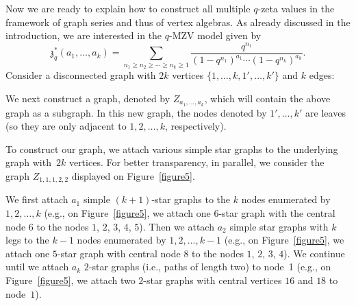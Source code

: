 \documentclass[pdftex]{sigma}
\numberwithin{equation}{section}
\theoremstyle{definition}
\begin{document}
Now we are ready to explain how to construct all multiple $q$-zeta values in the framework of graph series and thus of vertex algebras. As already discussed in the introduction, we
are interested
in the $q$-MZV model given by
\[
{\mathfrak{z}}_q^*(a_1,\dots,a_k)=\sum_{n_1 \geq n_2 \geq \cdots \geq n_k \geq 1} \frac{q^{n_1}}{(1-q^{n_1})^{a_1} \cdots (1-q^{n_k})^{a_k}}.
\]
Consider a disconnected graph with $2k$ vertices $\{1,\dots,k,1',\dots,k' \}$ and $k$ edges:
\begin{center}
\end{center}
We next construct a graph, denoted by $Z_{a_1,\dots,a_k}$, which will contain the above graph as a subgraph. In this new graph, the nodes denoted by $1',\dots,k'$ are leaves (so they are only adjacent to $1,2,\dots,k$, respectively).

To construct our graph, we attach various simple star graphs to the underlying graph with~$2k$ vertices. For better transparency, in parallel, we consider the graph
$Z_{1,1,1,2,2}$ displayed on Figure~\ref{figure5}.

We first attach $a_1$ simple $(k+1)$-star graphs to the $k$ nodes enumerated by $1,2,\dots,k$ (e.g., on Figure~\ref{figure5}, we attach one $6$-star graph with the central node $6$ to the nodes $1$, $2$, $3$, $4$, $5$).
Then we attach $a_2$ simple star graphs with $k$ legs to the $k-1$ nodes enumerated by $1,2,\dots,k-1$ (e.g., on Figure~\ref{figure5}, we attach one $5$-star graph with central node $8$ to the nodes $1$, $2$, $3$, $4$). We continue until we attach $a_k$ $2$-star graphs (i.e., paths of length two) to node~1 (e.g., on Figure~\ref{figure5}, we attach two $2$-star graphs with central vertices $16$ and $18$ to node~$1$).
\end{document}
